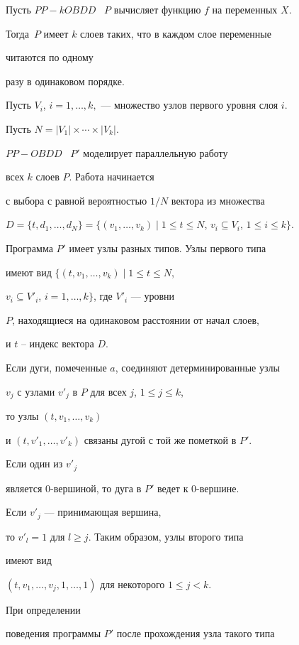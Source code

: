 \begin{pf}


Пусть $PP-kOBDD$ \ $P$ вычисляет функцию $f$ на переменных $X$.


Тогда~$P$ имеет $k$ слоев таких, что в каждом слое переменные


читаются по одному


разу в одинаковом порядке.


Пусть $V_i$, $i=1,\dotsc,k,$ --- множество узлов первого уровня слоя $i$.


Пусть $N=|V_1|\times\dotsb\times|V_k|$.





$PP{-}OBDD$ \ $P'$ моделирует параллельную работу


всех $k$ слоев $P$. Работа начинается


с выбора с равной вероятностью $1/N$ вектора из множества


$D=\{t,d_1,\dotsc,d_N\}=


\{(v_1,\dotsc ,v_k)\mid 1\leq t\leq N$, $v_i\subseteq V_i$, $1\leq i\leq k\}$.


Программа $P'$ имеет узлы разных типов. Узлы первого типа


имеют вид $\{(t,v_1,\dotsc,v_k)\mid 1\leq t\leq N$,


$v_i\subseteq V'_i$, $i=1,\dotsc,k\}$, где $V'_i$ --- уровни


$P$, находящиеся на одинаковом расстоянии от начал слоев,


и $t$ -- индекс вектора $D$.


Если дуги, помеченные $a$, соединяют детерминированные узлы


$v_j$ с узлами $v'_j$ в $P$ для всех $j$, $1\leq j\leq k$,


то узлы $(t,v_1,\dotsc,v_k)$


и $(t,v'_1,\dotsc,v'_k)$ связаны дугой с той же пометкой в $P'$.


Если один из $v'_j$


является $0$-вершиной, то дуга в $P'$ ведет к $0$-вершине.


Если $v'_j$ --- принимающая вершина,


то $v'_l=1$ для $l\geq j$. Таким образом, узлы второго типа


имеют вид


$(t,v_1,\dotsc,v_j,1,\dotsc,1)$ для некоторого $1\leq j<k$.


При определении


поведения программы $P'$ после прохождения узла такого типа



\end{pf}
